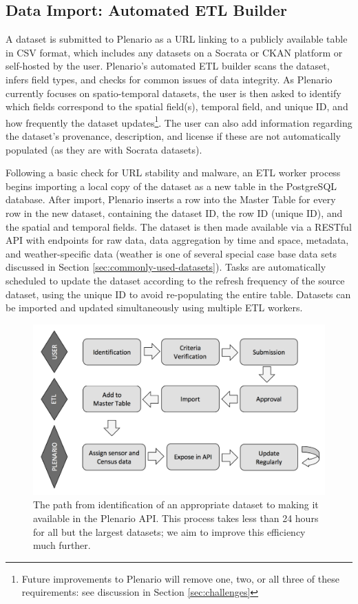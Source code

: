 \documentclass[11pt]{article}
\begin{document}
\subsection[data-import]{Data Import: \textbf{Automated ETL Builder}}
A dataset is submitted to Plenario as a URL linking to a publicly available table in CSV format, which includes any datasets on a Socrata or CKAN platform or self-hosted by the user. Plenario's automated ETL builder scans the dataset, infers field types, and checks for common issues of data integrity. As Plenario currently focuses on spatio-temporal datasets, the user is then asked to identify which fields correspond to the spatial field(s), temporal field, and unique ID, and how frequently the dataset updates\footnote{Future improvements to Plenario will remove one, two, or all three of these requirements: see discussion in Section \ref{sec:challenges}}. The user can also add information regarding the dataset's provenance, description, and license if these are not automatically populated (as they are with Socrata datasets). 

Following a basic check for URL stability and malware, an ETL worker process begins importing a local copy of the dataset as a new table in the PostgreSQL database. After import, Plenario inserts a row into the Master Table for every row in the new dataset, containing the dataset ID, the row ID (unique ID), and the spatial and temporal fields. The dataset is then made available via a RESTful API with endpoints for raw data, data aggregation by time and space, metadata, and weather-specific data (weather is one of several special case base data sets discussed in Section \ref{sec:commonly-used-datasets}). Tasks are automatically scheduled to update the dataset according to the refresh frequency of the source dataset, using the unique ID to avoid re-populating the entire table. Datasets can be imported and updated simultaneously using multiple ETL workers.

\begin{figure}
	\centering
	\label{fig:flowchart}
	\caption{The path from identification of an appropriate dataset to making it available in the Plenario API. This process takes less than 24 hours for all but the largest datasets; we aim to improve this efficiency much further.}
	\includegraphics[scale=.45]{flowchart.pdf}
\end{figure}
\end{document}
